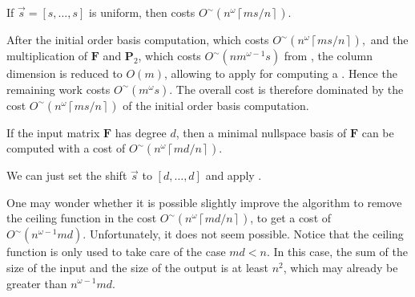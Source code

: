 \begin{lem}
\label{lem:costOfMinimalNullspaceBasisWithUniformShift}If $\vec{s}=\left[s,\dots,s\right]$
is uniform, then  costs $O^{\sim}\left(n^{\omega}\left\lceil ms/n\right\rceil \right)$. \end{lem}
\begin{pf}
After the initial order basis computation, which costs $O^{\sim}\left(n^{\omega}\left\lceil ms/n\right\rceil \right),$
and the multiplication of $\mathbf{F}$ and $\mathbf{P}_{2}$, which
costs $O^{\sim}\left(nm^{\omega-1}s\right)$ from ,
the column dimension is reduced to $O\left(m\right)$, allowing 
to apply for computing a . Hence the remaining work costs $O^{\sim}\left(m^{\omega}s\right)$.
The overall cost is therefore dominated by the cost $O^{\sim}\left(n^{\omega}\left\lceil ms/n\right\rceil \right)$
of the initial order basis computation.\end{pf}
\begin{thm}
\label{cor:costOfMinimalNullspaceBasis}If the input matrix $\mathbf{F}$
has degree $d$, then a minimal nullspace basis of $\mathbf{F}$ can
be computed with a cost of $O^{\sim}\left(n^{\omega}\left\lceil md/n\right\rceil \right)$. \end{thm}
\begin{pf}
We can just set the shift $\vec{s}$ to $\left[d,\dots,d\right]$
and apply .\end{pf}
\begin{rem}
One may wonder whether it is possible slightly improve the algorithm
to remove the ceiling function in the cost $O^{\sim}\left(n^{\omega}\left\lceil md/n\right\rceil \right)$,
to get a cost of $O^{\sim}\left(n^{\omega-1}md\right)$. Unfortunately,
it does not seem possible. Notice that the ceiling function is only
used to take care of the case $md<n$. In this case, the sum of the
size of the input and the size of the output is at least $n^{2}$,
which may already be greater than $n^{\omega-1}md$.\end{rem}

